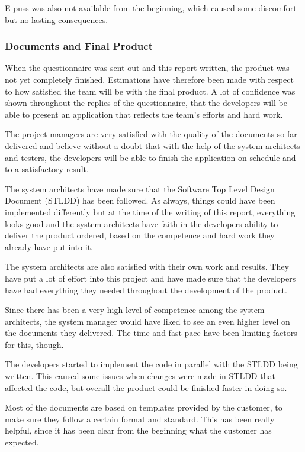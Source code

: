\documentclass[a4paper]{article}
\begin{document}
E-puss was also not available from the beginning, which caused some discomfort but no lasting consequences.


\subsubsection{Documents and Final Product}
When the questionnaire was sent out and this report written, the product was not yet completely finished. Estimations have therefore been made with respect to how satisfied the team will be with the final product. A lot of confidence was shown throughout the replies of the questionnaire, that the developers will be able to present an application that reflects the team's efforts and hard work. 

The project managers are very satisfied with the quality of the documents so far delivered and believe without a doubt that with the help of the system architects and testers, the developers will be able to finish the application on schedule and to a satisfactory result.

The system architects have made sure that the Software Top Level Design Document (STLDD) has been followed. As always, things could have been implemented differently but at the time of the writing of this report, everything looks good and the system architects have faith in the developers ability to deliver the product ordered, based on the competence and hard work they already have put into it.  

The system architects are also satisfied with their own work and results. They have put a lot of effort into this project and have made sure that the developers have had everything they needed throughout the development of the product.

Since there has been a very high level of competence among the system architects, the system manager would have liked to see an even higher level on the documents they delivered. The time and fast pace have been limiting factors for this, though. 

The developers started to implement the code in parallel with the STLDD being written. This caused some issues when changes were made in STLDD that affected the code, but overall the product could be finished faster in doing so. 

Most of the documents are based on templates provided by the customer, to make sure they follow a certain format and standard. This has been really helpful, since it has been clear from the beginning what the customer has expected.
\end{document}
